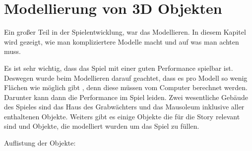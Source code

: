\section{Modellierung von 3D Objekten}
\label{sec:Modellierung_von_3D_Objekten}
Ein großer Teil in der Spielentwicklung, war das Modellieren. In diesem Kapitel wird gezeigt, wie man kompliziertere
Modelle macht und auf was man achten muss.

Es ist sehr wichtig, dass das Spiel mit einer guten Performance spielbar ist. Deswegen wurde beim Modellieren darauf geachtet,
dass es pro Modell so wenig Flächen wie möglich gibt \citep{unreal:modellierungVon3dObjekten_performance}, denn diese müssen vom Computer berechnet werden.
Darunter kann dann die Performance im Spiel leiden.
Zwei wesentliche Gebäude des Spieles sind das Haus des Grabwächters und das Mausoleum inklusive aller enthaltenen Objekte.
Weiters gibt es einige Objekte die für die Story relevant sind und Objekte, die modelliert wurden um das Spiel zu füllen.

Auflistung der Objekte:

